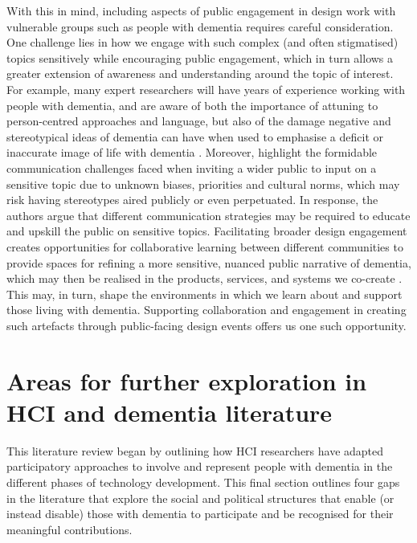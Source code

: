 With this in mind, including aspects of public engagement in design work with vulnerable groups such as people with dementia requires careful consideration. One challenge lies in how we engage with such complex (and often stigmatised) topics sensitively while encouraging public engagement, which in turn allows a greater extension of awareness and understanding around the topic of interest. For example, many expert researchers will have years of experience working with people with dementia, and are aware of both the importance of attuning to person-centred approaches \citep{fazio_fundamentals_2018} and language, but also of the damage negative and stereotypical ideas of dementia can have when used to emphasise a deficit or inaccurate image of life with dementia \citep{young_expanding_2019}. Moreover, \cite{niederdeppe2008message} highlight the formidable communication challenges faced when inviting a wider public to input on a sensitive topic due to unknown biases, priorities and cultural norms, which may risk having stereotypes aired publicly or even perpetuated. In response, the authors argue that different communication strategies may be required to educate and upskill the public on sensitive topics. Facilitating broader design engagement creates opportunities for collaborative learning between different communities to provide spaces for refining a more sensitive, nuanced public narrative of dementia, which may then be realised in the products, services, and systems we co-create \citep{costanza-chock_design_2020}. This may, in turn, shape the environments in which we learn about and support those living with dementia. Supporting collaboration and engagement in creating such artefacts through public-facing design events offers us one such opportunity. 

\section{Areas for further exploration in HCI and dementia literature}
\label{BL:Missing-gaps}
This literature review began by outlining how HCI researchers have adapted participatory approaches to involve and represent people with dementia in the different phases of technology development. This final section outlines four gaps in the literature that explore the social and political structures that enable (or instead disable) those with dementia to participate and be recognised for their meaningful contributions. 

